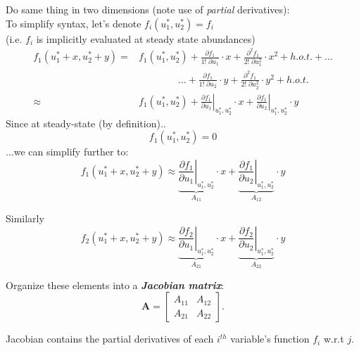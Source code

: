 \documentclass{article}
\newcommand{\ind}{\-\hspace{1cm}}
\begin{document}
Do same thing in two dimensions (note use of \emph{partial} derivatives):\\

To simplify syntax, let's denote $f_i(u_1^*,u_2^*) = f_i$\\
\ind (i.e. $f_i$ is implicitly evaluated at steady state abundances)
\begin{align*}
	f_1(u_1^* + x, u_2^* + y) = & f_1(u_1^*,u_2^*) + \frac{\partial f_1}{1! \phantom{.}\partial u_1} \cdot x + \frac{\partial^2 f_1}{2! \phantom{.} \partial u_1^2} \cdot x^2 + h.o.t. + \dots \\
	&\quad \quad \quad \quad \dots  + \frac{\partial f_1}{1!\phantom{.} \partial u_2} \cdot y + \frac{\partial^2 f_1}{2!\phantom{.} \partial u_2^2} \cdot y^2 +  h.o.t.\\
	 \approx & f_1(u_1^*, u_2^*) + \left. \frac{\partial f_1}{\partial u_1}\right|_{u_1^*, u_2^*} \cdot x + \left. \frac{\partial f_1}{\partial u_2}\right|_{u_1^*, u_2^*} \cdot y
\end{align*}
Since at steady-state (by definition)..
\begin{equation*}
	f_1(u_1^*,u_2^*)=0
\end{equation*}
...we can simplify further to:
\begin{equation*}
	f_1(u_1^* + x, u_2^* + y)\approx \underbrace{\left. \frac{\partial f_1}{\partial u_1}\right|_{u_1^*, u_2^*}}_{A_{11}} \cdot x + \underbrace{\left. \frac{\partial f_1}{\partial u_2}\right|_{u_1^*, u_2^*}}_{A_{12}} \cdot y
\end{equation*}

Similarly
\begin{equation*}
	f_2(u_1^* + x, u_2^* + y)\approx \underbrace{\left. \frac{\partial f_2}{\partial u_1}\right|_{u_1^*, u_2^*}}_{A_{21}} \cdot x + \underbrace{\left. \frac{\partial f_2}{\partial u_2}\right|_{u_1^*, u_2^*}}_{A_{22}} \cdot y
\end{equation*}

Organize these elements into a \emph{\textbf{Jacobian matrix}}:
\begin{equation*}
\mathbf{A}=
	\begin{bmatrix}
	A_{11} & A_{12}\\
	A_{21} & A_{22}
	\end{bmatrix}.
\end{equation*}

Jacobian contains the partial derivatives of each $i^{th}$ variable's function $f_i$ w.r.t $j$.\\
\end{document}
